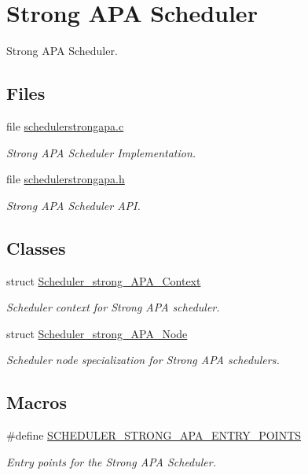 \hypertarget{group__RTEMSScoreSchedulerStrongAPA}{}\section{Strong A\+PA Scheduler}
\label{group__RTEMSScoreSchedulerStrongAPA}


Strong A\+PA Scheduler.  


\subsection*{Files}
\begin{DoxyCompactItemize}
\item 
file \hyperlink{schedulerstrongapa_8c}{schedulerstrongapa.\+c}
\begin{DoxyCompactList}\small\item\em Strong A\+PA Scheduler Implementation. \end{DoxyCompactList}\item 
file \hyperlink{schedulerstrongapa_8h}{schedulerstrongapa.\+h}
\begin{DoxyCompactList}\small\item\em Strong A\+PA Scheduler A\+PI. \end{DoxyCompactList}\end{DoxyCompactItemize}
\subsection*{Classes}
\begin{DoxyCompactItemize}
\item 
struct \hyperlink{structScheduler__strong__APA__Context}{Scheduler\+\_\+strong\+\_\+\+A\+P\+A\+\_\+\+Context}
\begin{DoxyCompactList}\small\item\em Scheduler context for Strong A\+PA scheduler. \end{DoxyCompactList}\item 
struct \hyperlink{structScheduler__strong__APA__Node}{Scheduler\+\_\+strong\+\_\+\+A\+P\+A\+\_\+\+Node}
\begin{DoxyCompactList}\small\item\em Scheduler node specialization for Strong A\+PA schedulers. \end{DoxyCompactList}\end{DoxyCompactItemize}
\subsection*{Macros}
\begin{DoxyCompactItemize}
\item 
\#define \hyperlink{group__RTEMSScoreSchedulerStrongAPA_ga98b37281082c0be47dc489eed554c5cc}{S\+C\+H\+E\+D\+U\+L\+E\+R\+\_\+\+S\+T\+R\+O\+N\+G\+\_\+\+A\+P\+A\+\_\+\+E\+N\+T\+R\+Y\+\_\+\+P\+O\+I\+N\+TS}
\begin{DoxyCompactList}\small\item\em Entry points for the Strong A\+PA Scheduler. \end{DoxyCompactList}\end{DoxyCompactItemize}
